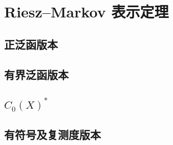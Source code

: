 \section{Riesz–Markov 表示定理}
\label{b1:sec:1104}


\subsection{正泛函版本}
\label{b1:subsec:110401}

\subsection{有界泛函版本}
\label{b1:subsec:110402}

\subsection{\texorpdfstring{\(C_0(X)^*\)}{C0(X)*}}
\label{b1:subsec:110403}

\subsection{有符号及复测度版本}
\label{b1:subsec:110404}


